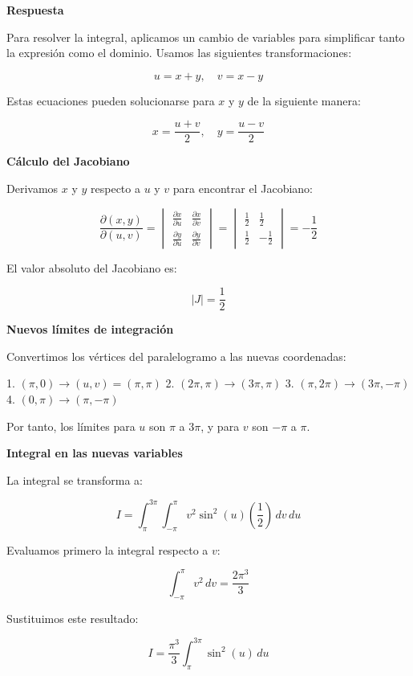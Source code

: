 \documentclass{report}
\begin{document}
\textbf{Respuesta}

Para resolver la integral, aplicamos un cambio de variables para simplificar tanto la expresión como el dominio. Usamos las siguientes transformaciones:

\[
u = x + y, \quad v = x - y
\]

Estas ecuaciones pueden solucionarse para \(x\) y \(y\) de la siguiente manera:

\[
x = \frac{u + v}{2}, \quad y = \frac{u - v}{2}
\]

\textbf{Cálculo del Jacobiano}

Derivamos \(x\) y \(y\) respecto a \(u\) y \(v\) para encontrar el Jacobiano:

\[
\frac{\partial(x, y)}{\partial(u, v)} = 
\begin{vmatrix}
\frac{\partial x}{\partial u} & \frac{\partial x}{\partial v} \\
\frac{\partial y}{\partial u} & \frac{\partial y}{\partial v}
\end{vmatrix} =
\begin{vmatrix}
\frac{1}{2} & \frac{1}{2} \\
\frac{1}{2} & -\frac{1}{2}
\end{vmatrix} 
= -\frac{1}{2}
\]

El valor absoluto del Jacobiano es:

\[
|J| = \frac{1}{2}
\]

\textbf{Nuevos límites de integración}

Convertimos los vértices del paralelogramo a las nuevas coordenadas:

1. \((\pi, 0) \rightarrow (u, v) = (\pi, \pi)\)
2. \((2\pi, \pi) \rightarrow (3\pi, \pi)\)
3. \((\pi, 2\pi) \rightarrow (3\pi, -\pi)\)
4. \((0, \pi) \rightarrow (\pi, -\pi)\)

Por tanto, los límites para \(u\) son \(\pi\) a \(3\pi\), y para \(v\) son \(-\pi\) a \(\pi\).

\textbf{Integral en las nuevas variables}

La integral se transforma a:

\[
I = \int_{\pi}^{3\pi} \int_{-\pi}^{\pi} v^2 \sin^2(u) \left(\frac{1}{2}\right) \, dv \, du
\]

Evaluamos primero la integral respecto a \(v\):

\[
\int_{-\pi}^{\pi} v^2 \, dv = \frac{2\pi^3}{3}
\]

Sustituimos este resultado:

\[
I = \frac{\pi^3}{3} \int_{\pi}^{3\pi} \sin^2(u) \, du
\]
\end{document}
